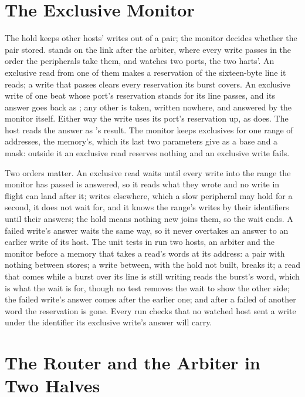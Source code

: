 \documentclass[journal,9pt]{IEEEtran}
\begin{document}
\section{The Exclusive Monitor}
\label{sec:a-exmon}

The hold keeps other hosts' writes out of a pair; the monitor decides
whether the pair stored.  stands on the link after the
arbiter, where every write passes in the order the peripherals take
them, and watches two ports, the two harts'. An exclusive read from
one of them makes a reservation of the sixteen-byte line it reads; a
write that passes clears every reservation its burst covers. An
exclusive write of one beat whose port's reservation stands for its
line passes, and its answer goes back as ; any other is
taken, written nowhere, and answered  by the monitor
itself. Either way the write uses its port's reservation up, as
 does. The host reads the answer as 's result.
The monitor keeps exclusives for one range of addresses, the memory's,
which its last two parameters give as a base and a mask: outside it an
exclusive read reserves nothing and an exclusive write fails.

Two orders matter. An exclusive read waits until every write into the
range the monitor has passed is answered, so it reads what they wrote
and no write in flight can land after it; writes elsewhere, which a
slow peripheral may hold for a second, it does not wait for, and it
knows the range's writes by their identifiers until their answers; the hold means nothing new joins
them, so the wait ends. A failed write's answer waits the same way,
so it never overtakes an answer to an earlier write of its host.
The unit tests in  run two hosts, an
arbiter and the monitor before a memory that takes a read's words at
its address: a pair with nothing between stores; a write between, with
the hold not built, breaks it; a read that comes while a burst over
its line is still writing reads the burst's word, which is what the
wait is for, though no test removes the wait to show the other side;
the failed write's answer comes after the
earlier one; and after a failed  of another word the
reservation is gone. Every run checks that no watched host sent a
write under the identifier its exclusive write's answer will carry.

\section{The Router and the Arbiter in Two Halves}
\label{sec:a-halves}
\end{document}
